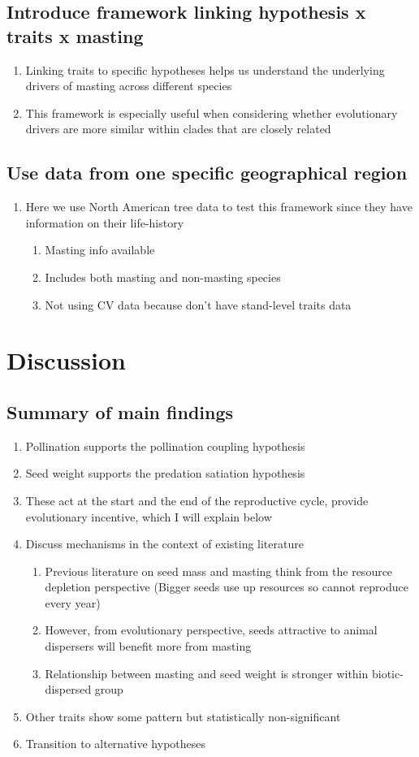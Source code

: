 \documentclass{article}
\begin{document}
\subsection{Introduce framework linking hypothesis x traits x masting}
\begin{enumerate}
\item Linking traits to specific hypotheses helps us understand the underlying drivers of masting across different species
\item This framework is especially useful when considering whether evolutionary drivers are more similar within clades that are closely related
\end{enumerate}
\subsection{Use data from one specific geographical region}
\begin{enumerate}
\item Here we use North American tree data to test this framework since they have information on their life-history
\begin{enumerate}
\item Masting info available
\item Includes both masting and non-masting species
\item Not using CV data because don't have stand-level traits data
\end{enumerate}
\end{enumerate}

\section{Discussion}
\subsection{Summary of main findings}
\begin{enumerate}
\item Pollination supports the pollination coupling hypothesis
\item Seed weight supports the predation satiation hypothesis
\item These act at the start and the end of the reproductive cycle, provide evolutionary incentive, which I will explain below
\item Discuss mechanisms in the context of existing literature
\begin{enumerate}
\item Previous literature on seed mass and masting think from the resource depletion perspective (Bigger seeds use up resources so cannot reproduce every year)
\item However, from evolutionary perspective, seeds attractive to animal dispersers will benefit more from masting
\item Relationship between masting and seed weight is stronger within biotic-dispersed group
\end{enumerate}
\item Other traits show some pattern but statistically non-significant
\item Transition to alternative hypotheses
\end{enumerate}
\end{document}

